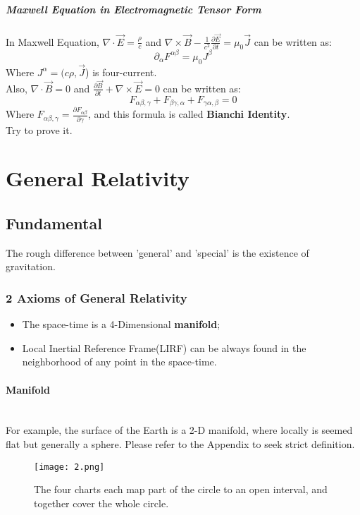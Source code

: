 \documentclass[openany,10pt]{book}
\theoremstyle{definition}
\theoremstyle{definition}
\theoremstyle{remark}
\begin{document}
\subsubsection{Maxwell Equation in Electromagnetic Tensor Form}
In Maxwell Equation, $\nabla\cdot\vec{E}=\frac{\rho}{c}$ and $\nabla\times\vec{B}-\frac{1}{c^2}\frac{\partial\vec{E}}{\partial t}=\mu_0 \vec{J}$ can be written as:
\begin{equation}
    \partial_\alpha F^{\alpha\beta}=\mu_0J^\beta
\end{equation}
Where $J^\alpha=(c\rho,\vec{J}$) is four-current.\\
Also, $\nabla\cdot\vec{B}=0$ and $\frac{\partial\vec{B}}{\partial t}+\nabla\times\vec{E}=0$ can be written as:
\begin{equation}\label{Fbianchi}
    F_{\alpha\beta,\gamma}+F_{\beta\gamma,\alpha}+F_{\gamma\alpha,\beta }=0
\end{equation}
Where $F_{\alpha\beta,\gamma}=\frac{\partial F_{\alpha\beta}}{\partial\gamma}$, and this formula is called \textbf{Bianchi Identity}.\\
Try to prove it. 


\part{General Relativity}
\chapter{Fundamental}
The rough difference between 'general' and 'special' is the existence of gravitation.

\section{2 Axioms of General Relativity}
\begin{itemize}
\item The space-time is a 4-Dimensional {\bfseries manifold};
\item Local Inertial Reference Frame(LIRF) can be always found in the neighborhood of any point in the space-time.
\end{itemize}

\subsection{Manifold}
\\
For example, the surface of the Earth is a 2-D manifold, where locally is seemed flat but generally a sphere.
Please refer to the Appendix to seek strict definition.
\begin{figure}[htbp]

  \centering
    \texttt{[image: 2.png]}
 \caption{The four charts each map part of the circle to an open interval, and together cover the whole circle.}
\end{figure}
\end{document}
